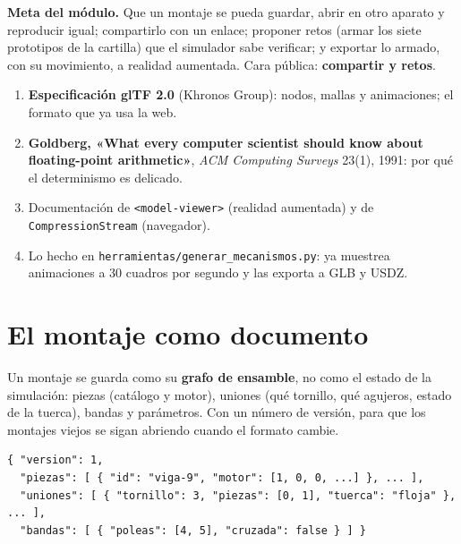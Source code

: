 \documentclass[11pt,a4paper]{article}
\begin{document}
\maketitle
\vspace{-2.5em}

\begin{meta}
\textbf{\textcolor{amarillo}{Meta del módulo.}} Que un montaje se pueda guardar, abrir en otro aparato y reproducir
igual; compartirlo con un enlace; proponer retos (armar los siete prototipos de la cartilla) que el simulador sabe
verificar; y exportar lo armado, con su movimiento, a realidad aumentada. Cara pública: \textbf{compartir y retos}.
\end{meta}

\begin{lectura}
\begin{enumerate}[leftmargin=*]
  \item \textbf{Especificación glTF 2.0} (Khronos Group): nodos, mallas y animaciones; el formato que ya usa la web.
  \item \textbf{Goldberg, «What every computer scientist should know about floating-point arithmetic»},
        \emph{ACM Computing Surveys} 23(1), 1991: por qué el determinismo es delicado.
  \item Documentación de \texttt{<model-viewer>} (realidad aumentada) y de \texttt{CompressionStream} (navegador).
  \item Lo hecho en \texttt{herramientas/generar\_mecanismos.py}: ya muestrea animaciones a 30 cuadros por segundo y
        las exporta a GLB y USDZ.
\end{enumerate}
\end{lectura}

\section{El montaje como documento}

Un montaje se guarda como su \textbf{grafo de ensamble}, no como el estado de la simulación: piezas (catálogo y
motor), uniones (qué tornillo, qué agujeros, estado de la tuerca), bandas y parámetros. Con un número de versión, para
que los montajes viejos se sigan abriendo cuando el formato cambie.

\begin{lstlisting}
{ "version": 1,
  "piezas": [ { "id": "viga-9", "motor": [1, 0, 0, ...] }, ... ],
  "uniones": [ { "tornillo": 3, "piezas": [0, 1], "tuerca": "floja" }, ... ],
  "bandas": [ { "poleas": [4, 5], "cruzada": false } ] }
\end{lstlisting}
\end{document}
